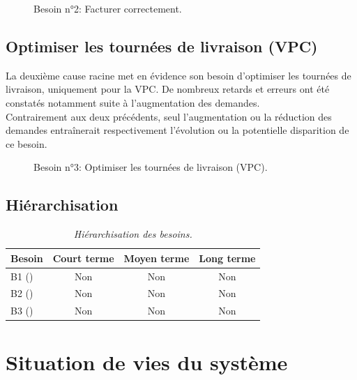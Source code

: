 \documentclass{article}
\begin{document}
\begin{figure}[hbt!]
	\centering
	
	\caption{
		Besoin n°2: Facturer correctement.
	}
\end{figure}
\FloatBarrier

\subsection{Optimiser les tournées de livraison (VPC)}
	\label{cat:besoin:livraison}
La deuxième cause racine met en évidence son besoin d'optimiser les tournées de
livraison, uniquement pour la VPC. De nombreux retards et erreurs ont été
constatés notamment suite à l'augmentation des demandes.
\medskip\\
Contrairement aux deux précédents, seul l'augmentation ou la réduction
des demandes entraînerait respectivement l'évolution ou la potentielle
disparition de ce besoin.

\begin{figure}[hbt!]
	\centering
	
	\caption{
		Besoin n°3: Optimiser les tournées de livraison (VPC).
	}
\end{figure}
\FloatBarrier

\newpage
\subsection{Hiérarchisation}

\begin{table}[hbt!]
\centering

\renewcommand{\arraystretch}{2}
\begin{tabularx}{1\textwidth}{|X|c|c|c|}
	\hline
		\textbf{Besoin}
		& \textbf{Court terme} & \textbf{Moyen terme} & \textbf{Long terme}\\
	\hline
		B1 (\nameref{cat:besoin:stock})
		& Non & Non & Non\\
	\hline
		B2 (\nameref{cat:besoin:facturer})
		& Non & Non & Non\\
	\hline
		B3 (\nameref{cat:besoin:livraison})
		& Non & Non & Non\\
	\hline
\end{tabularx}

\caption{\textit{Hiérarchisation des besoins.}}
\end{table}

\section{Situation de vies du système}
\end{document}
